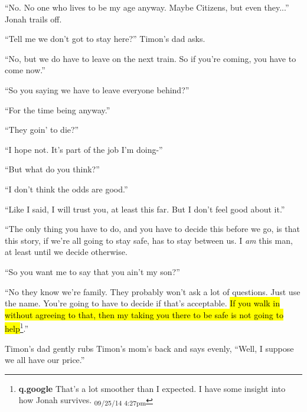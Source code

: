 ``No.  No one who lives to be my age anyway.  Maybe Citizens, but even they...'' Jonah trails off.

``Tell me we don't got to stay here?'' Timon's dad asks.

``No, but we do have to leave on the next train.  So if you're coming, you have to come now.''

``So you saying we have to leave everyone behind?''

``For the time being anyway.''

``They goin' to die?''

``I hope not.  It's part of the job I'm doing-''

``But what do you think?''

``I don't think the odds are good.''

``Like I said, I will trust you, at least this far.  But I don't feel good about it.''

``The only thing you have to do, and you have to decide this before we go, is that this story, if we're all going to stay safe, has to stay between us.  I \textit{am }this man, at least until we decide otherwise.

``So you want me to say that you ain't my son?''

``No they know we're family.  They probably won't ask a lot of questions.  Just use the name.  You're going to have to decide if that's acceptable.   \hl{If you walk in without agreeing to that, then my taking you there to be safe is not going to help}\footnote{\textbf{q.google }That's a lot smoother than I expected.  I have some insight into how Jonah survives. \textsubscript{09/25/14 4:27pm}}.''

Timon's dad gently rubs Timon's mom's back and says evenly, ``Well, I suppose we all have our price.''




